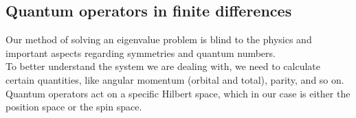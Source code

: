 \subsection{Quantum operators in finite differences}
Our method of solving an eigenvalue problem is blind to the physics and important aspects regarding symmetries and quantum numbers.
\\To better understand the system we are dealing with, we need to calculate certain quantities, like angular momentum (orbital and total), parity, and so on.
\\Quantum operators act on a specific Hilbert space, which in our case is either the position space or the spin space.

